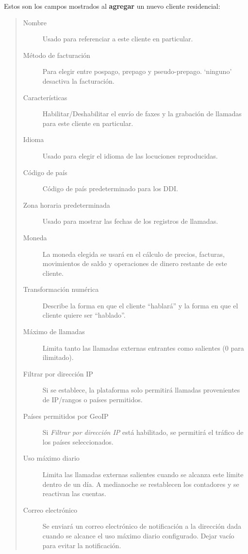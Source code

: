\documentclass[letterpaper,10pt,spanish]{sphinxmanual}
\begin{document}
Estos son los campos mostrados al \textbf{agregar} un nuevo cliente residencial:
\begin{quote}
\begin{description}
\item[{Nombre}] \leavevmode
Usado para referenciar a este cliente en particular.

\item[{Método de facturación}] \leavevmode
Para elegir entre pospago, prepago y pseudo-prepago. `ninguno' desactiva la facturación.

\item[{Características}] \leavevmode
Habilitar/Deshabilitar el envío de faxes y la grabación de llamadas para este cliente en particular.

\item[{Idioma}] \leavevmode
Usado para elegir el idioma de las locuciones reproducidas.

\item[{Código de país}] \leavevmode
Código de país predeterminado para los DDI.

\item[{Zona horaria predeterminada}] \leavevmode
Usado para mostrar las fechas de los registros de llamadas.

\item[{Moneda}] \leavevmode
La moneda elegida se usará en el cálculo de precios, facturas, movimientos de saldo y operaciones de dinero restante de este cliente.

\item[{Transformación numérica}] \leavevmode
Describe la forma en que el cliente ``hablará'' y la forma en que el cliente quiere ser ``hablado''.

\item[{Máximo de llamadas}] \leavevmode
Limita tanto las llamadas externas entrantes como salientes (0 para ilimitado).

\item[{Filtrar por dirección IP}] \leavevmode
Si se establece, la plataforma solo permitirá llamadas provenientes de IP/rangos o países permitidos.

\item[{Países permitidos por GeoIP}] \leavevmode
Si \emph{Filtrar por dirección IP} está habilitado, se permitirá el tráfico de los países seleccionados.

\item[{Uso máximo diario}] \leavevmode
Limita las llamadas externas salientes cuando se alcanza este límite dentro de un día. A medianoche se restablecen los contadores y se reactivan las cuentas.

\item[{Correo electrónico}] \leavevmode
Se enviará un correo electrónico de notificación a la dirección dada cuando se alcance el uso máximo diario configurado. Dejar vacío para evitar la notificación.

\end{description}
\end{quote}
\end{document}

